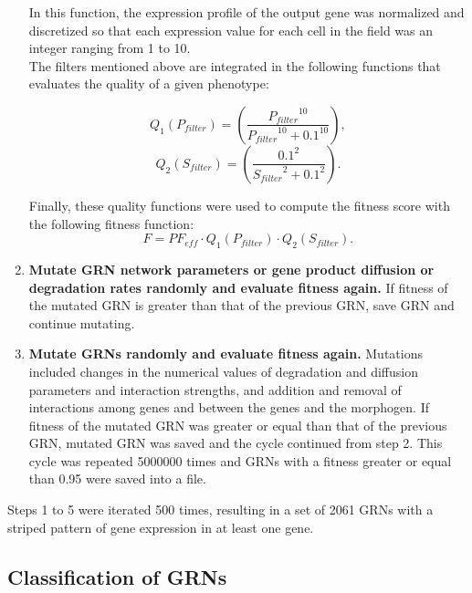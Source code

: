 \documentclass[10pt,letterpaper]{article}
\begin{document}
\begin{enumerate}
 In this function, the expression profile of the output gene was normalized and
 discretized so that each expression value for each cell in the field was an
 integer ranging from 1 to 10.\\
 
 The filters mentioned above are integrated in the following functions that 
 evaluates the  quality of a given phenotype:
 
 \begin{equation}
  Q_1(P_{filter}) = \left( \frac{ {P_{filter}}^{10} }{ {P_{filter}}^{10} + 
  0.1^{10} } \right),
 \end{equation}
 \begin{equation}
  Q_2(S_{filter}) = \left( \frac{ 0.1^2 }{ {S_{filter}}^2 + 0.1^2 } \right).
 \end{equation}

 Finally, these quality functions were used to compute the fitness score with
 the following fitness function:
 \begin{equation}
  F = \mathit{PF_{eff}} \cdot Q_1(P_{filter}) \cdot Q_2(S_{filter}).
 \end{equation}

 \item{\bf Mutate GRN network parameters or gene product diffusion or 
degradation rates randomly and evaluate fitness again.} If fitness of the 
mutated GRN is greater than that of the previous GRN, save GRN and continue 
mutating.
 
 \item {\bf Mutate GRNs randomly and evaluate fitness again.} Mutations 
included changes in the  numerical values of degradation and diffusion 
parameters and interaction strengths, and addition and removal of interactions 
among genes and between the genes and the morphogen. If fitness of the mutated 
GRN was greater or equal than that of the previous GRN, mutated GRN was saved 
and the cycle continued from step 2. This cycle was repeated 5000000 times and 
GRNs with a fitness greater or equal than 0.95 were saved into a file.

\end{enumerate}

Steps 1 to 5 were iterated 500 times, resulting in a set of 2061 GRNs with a 
striped pattern of gene expression in at least one gene.

\subsection*{Classification of GRNs}
\end{document}
